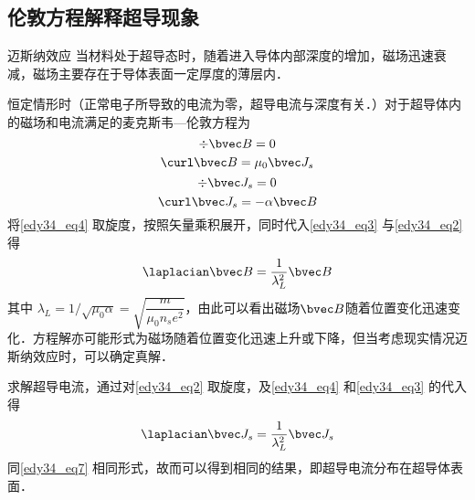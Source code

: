 \subsection{伦敦方程解释超导现象}
\begin{theorem}{迈斯纳效应}
当材料处于超导态时，随着进入导体内部深度的增加，磁场迅速衰减，磁场主要存在于导体表面一定厚度的薄层内．
\end{theorem}
恒定情形时（正常电子所导致的电流为零，超导电流与深度有关．）对于超导体内的磁场和电流满足的麦克斯韦—伦敦方程为
\begin{equation}
\div \bvec B=0\label{edy34_eq3}
\end{equation}
\begin{equation}
\curl \bvec B=\mu_0 \bvec J_s\label{edy34_eq4}
\end{equation}
\begin{equation}
\div \bvec J_s=0\label{edy34_eq5}
\end{equation}
\begin{equation}
\curl \bvec J_s=-\alpha\bvec B
\end{equation}
将\autoref{edy34_eq4} 取旋度，按照矢量乘积展开，同时代入\autoref{edy34_eq3} 与\autoref{edy34_eq2} 得
\begin{equation}
\laplacian \bvec B=\dfrac{1}{\lambda_L^2}\bvec B \label{edy34_eq7}
\end{equation}
其中 $\lambda_L= 1/\sqrt{\mu_0\alpha}=\sqrt{\dfrac m {\mu_0n_se^2}}$，由此可以看出磁场$\bvec B$随着位置变化迅速变化．方程解亦可能形式为磁场随着位置变化迅速上升或下降，但当考虑现实情况迈斯纳效应时，可以确定真解．

求解超导电流，通过对\autoref{edy34_eq2} 取旋度，及\autoref{edy34_eq4} 和\autoref{edy34_eq3} 的代入得
\begin{equation}
\laplacian\bvec J_s=\dfrac 1 {\lambda_L^2}\bvec J_s
\end{equation}
同\autoref{edy34_eq7} 相同形式，故而可以得到相同的结果，即超导电流分布在超导体表面．
